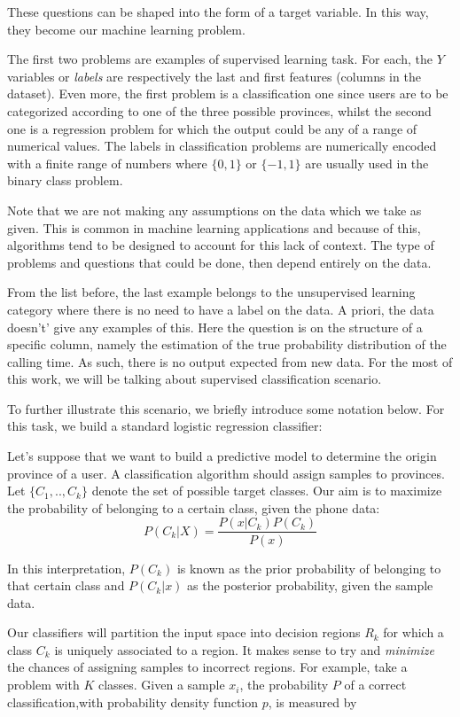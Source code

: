 These questions can be shaped into the form of a target variable. In this way, they become our machine learning problem.

The first two problems are examples of supervised learning task. For each, the $Y$ variables or \textit{labels} are respectively the last and first features (columns in the dataset). Even more, the first problem is a classification one since users are to be categorized according to one of the three possible provinces, whilst the second one is a regression problem for which the output could be any of a range of numerical values. The labels in classification problems are numerically encoded with a finite range of numbers where $\{0,1\}$ or $\{-1,1\}$ are usually used in the binary class problem.

Note that we are not making any assumptions on the data which we take as given. %
This is common in machine learning applications and because of this, algorithms tend to be designed to account for this lack of context. The type of problems and questions that could be done, then depend entirely on the data.

From the list before, the last example belongs to the unsupervised learning category where there is no need to have a label on the data. A priori, the data doesn't' give any examples of this. Here the question is on the structure of a specific column, namely the estimation of the true probability distribution of the calling time. As such, there is no output expected from new data. For the most of this work, we will be talking about supervised classification scenario.

To further illustrate this scenario, we briefly introduce some notation below. For this task, we build a standard logistic regression classifier:

Let's suppose that we want to build a predictive model to determine the origin province of a user. A classification algorithm should assign samples to provinces. Let $\{C_1,..,C_k\}$ denote the set of possible target classes. Our aim is to maximize the probability of belonging to a certain class, given the phone data:
\begin{equation}
P(C_k| X) = \frac{P(x|C_k)P(C_k)}{P(x)}
\end{equation}

In this interpretation, $P(C_k)$ is known as the prior probability of belonging to that certain class and $P(C_k|x)$ as the posterior probability, given the sample data.

Our classifiers will partition the input space into decision regions $R_k$ for which a class $C_k$ is uniquely associated to a region. It makes sense to try and \textit{minimize} the chances of assigning samples to incorrect regions. For example, take a problem with $K$ classes. Given a sample $x_i$, the probability $P$ of a correct classification,with probability density function $p$, is measured by

